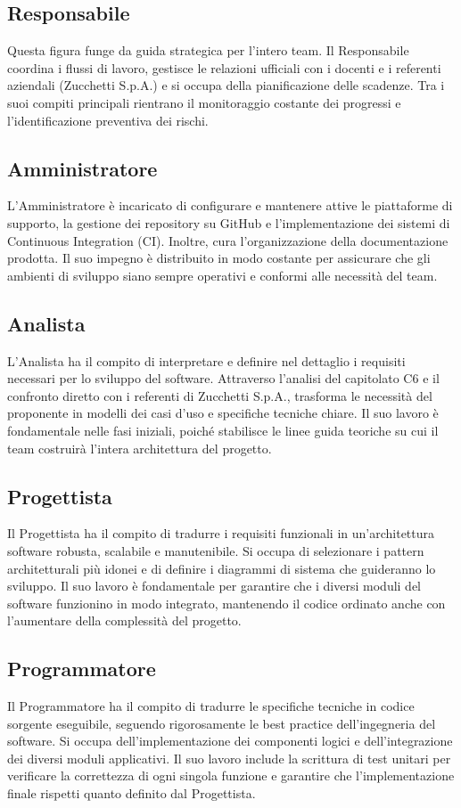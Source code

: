 \documentclass[a4paper, 10pt, colorlinks=true, linkcolor=black, urlcolor=blue, citecolor=blue, hidelinks]{article}
\begin{document}
\subsection{Responsabile}
Questa figura funge da guida strategica per l'intero team. Il Responsabile coordina i flussi di lavoro, gestisce le relazioni ufficiali con i docenti e i referenti aziendali (Zucchetti S.p.A.) e si occupa della pianificazione delle scadenze. Tra i suoi compiti principali rientrano il monitoraggio costante dei progressi e l'identificazione preventiva dei rischi.

\subsection{Amministratore}
L'Amministratore è incaricato di configurare e mantenere attive le piattaforme di supporto, la gestione dei repository su GitHub e l'implementazione dei sistemi di Continuous Integration (CI). Inoltre, cura l'organizzazione della documentazione prodotta. Il suo impegno è distribuito in modo costante per assicurare che gli ambienti di sviluppo siano sempre operativi e conformi alle necessità del team.

\subsection{Analista}
L'Analista ha il compito di interpretare e definire nel dettaglio i requisiti necessari per lo sviluppo del software. Attraverso l'analisi del capitolato C6 e il confronto diretto con i referenti di Zucchetti S.p.A., trasforma le necessità del proponente in modelli dei casi d'uso e specifiche tecniche chiare. Il suo lavoro è fondamentale nelle fasi iniziali, poiché stabilisce le linee guida teoriche su cui il team costruirà l'intera architettura del progetto.

\subsection{Progettista}
Il Progettista ha il compito di tradurre i requisiti funzionali in un'architettura software robusta, scalabile e manutenibile. Si occupa di selezionare i pattern architetturali più idonei e di definire i diagrammi di sistema che guideranno lo sviluppo. Il suo lavoro è fondamentale per garantire che i diversi moduli del software funzionino in modo integrato, mantenendo il codice ordinato anche con l'aumentare della complessità del progetto.

\subsection{Programmatore}
Il Programmatore ha il compito di tradurre le specifiche tecniche in codice sorgente eseguibile, seguendo rigorosamente le best practice dell'ingegneria del software. Si occupa dell'implementazione dei componenti logici e dell'integrazione dei diversi moduli applicativi. Il suo lavoro include la scrittura di test unitari per verificare la correttezza di ogni singola funzione e garantire che l'implementazione finale rispetti quanto definito dal Progettista.
\end{document}
